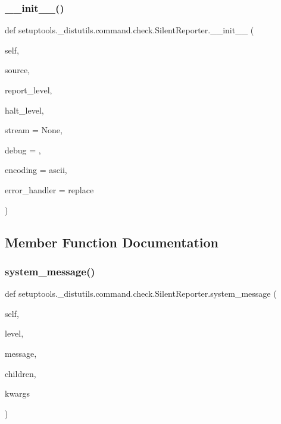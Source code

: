 \subsubsection{\texorpdfstring{\+\_\+\+\_\+init\+\_\+\+\_\+()}{\_\_init\_\_()}}
{\footnotesize\ttfamily def setuptools.\+\_\+distutils.\+command.\+check.\+Silent\+Reporter.\+\_\+\+\_\+init\+\_\+\+\_\+ (\begin{DoxyParamCaption}\item[{}]{self,  }\item[{}]{source,  }\item[{}]{report\+\_\+level,  }\item[{}]{halt\+\_\+level,  }\item[{}]{stream = {\ttfamily None},  }\item[{}]{debug = {},  }\item[{}]{encoding = {\ttfamily \textquotesingle{}ascii\textquotesingle{}},  }\item[{}]{error\+\_\+handler = {\ttfamily \textquotesingle{}replace\textquotesingle{}} }\end{DoxyParamCaption})}



\subsection{Member Function Documentation}
\mbox{\label{classsetuptools_1_1__distutils_1_1command_1_1check_1_1SilentReporter_a18aabb1f210ce866a065385ce1cdf2cd}} 
\subsubsection{\texorpdfstring{system\+\_\+message()}{system\_message()}}
{\footnotesize\ttfamily def setuptools.\+\_\+distutils.\+command.\+check.\+Silent\+Reporter.\+system\+\_\+message (\begin{DoxyParamCaption}\item[{}]{self,  }\item[{}]{level,  }\item[{}]{message,  }\item[{}]{children,  }\item[{}]{kwargs }\end{DoxyParamCaption})}



